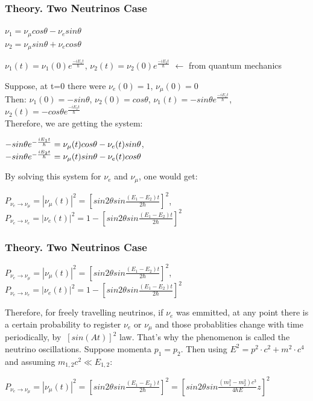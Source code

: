 \begin{frame}\frametitle{Theory. Two Neutrinos Case}
  \scriptsize
  \begin{center}
  $\nu_1=\nu_{\mu}cos\theta-\nu_esin\theta$\\
  $\nu_2=\nu_{\mu}sin\theta+\nu_ecos\theta$\\
  \end{center}
  \begin{center}
  $\nu_1(t)=\nu_1(0)e^{\frac{-iE_1t}{\hbar}}$, $\nu_2(t)=\nu_2(0)e^{\frac{-iE_2t}{\hbar}}$ $\leftarrow$ from quantum mechanics\\
  \end{center}
  Suppose, at t=0 there were $\nu_e(0)=1$, $\nu_\mu(0)=0$\\
  Then: $\nu_1(0)=-sin\theta$, $\nu_2(0)=cos\theta$, $\nu_1(t)=-{sin\theta}e^{\frac{-iE_1t}{\hbar}}$, $\nu_2(t)=-{cos\theta}e^{\frac{-iE_2t}{\hbar}}$\\
  Therefore, we are getting the system:\\
  \begin{center}
  $-{sin\theta}e^{-{{iE_1t} \over \hbar}}=\nu_\mu(t)cos\theta-\nu_e(t)sin\theta$,\\
  $-{sin\theta}e^{-{{iE_2t} \over \hbar}}=\nu_\mu(t)sin\theta-\nu_e(t)cos\theta$\\
  \end{center}
  By solving this system for $\nu_e$ and $\nu_\mu$, one would get:\\
  \begin{center}
  $P_{\nu_e \rightarrow \nu_\mu}=|\nu_\mu(t)|^2=[{sin2\theta}sin{\frac{(E_1-E_2)t}{2\hbar}}]^2$,\\
  $P_{\nu_e \rightarrow \nu_e}=|\nu_e(t)|^2=1-[{sin2\theta}sin{\frac{(E_1-E_2)t}{2\hbar}}]^2$\\
  \end{center}
\end{frame}

\begin{frame}\frametitle{Theory. Two Neutrinos Case}
  \scriptsize
  \begin{center}
  $P_{\nu_e \rightarrow \nu_\mu}=|\nu_\mu(t)|^2=[{sin2\theta}sin{\frac{(E_1-E_2)t}{2\hbar}}]^2$,\\
  $P_{\nu_e \rightarrow \nu_e}=|\nu_e(t)|^2=1-[{sin2\theta}sin{\frac{(E_1-E_2)t}{2\hbar}}]^2$\\
  \end{center}
  Therefore, for freely travelling neutrinos, if $\nu_e$ was emmitted, at any point there is a certain probability to register $\nu_e$ or $\nu_\mu$ and those probablities change with time periodically, by $~[sin(At)]^2$ law. That's why the phenomenon is called the neutrino oscillations.
  Suppose momenta $p_1=p_2$. Then using $E^2=p^2{\cdot}c^2+m^2{\cdot}c^4$ and assuming $m_{1,2}c^2 \ll E_{1,2}$: \\
  \begin{center}
  $P_{\nu_e \rightarrow \nu_\mu}=|\nu_\mu(t)|^2=[{sin2\theta}sin{\frac{(E_1-E_2)t}{2\hbar}}]^2=[{sin2\theta}sin{\frac{(m_1^2-m_2^2)c^3}{4\hbar{E}}z}]^2$\\  
  \end{center}
\end{frame}

